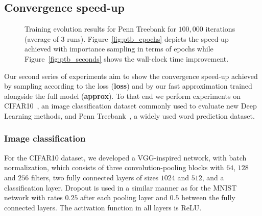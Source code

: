 \documentclass{article}
\begin{document}
\subsection{Convergence speed-up}

\begin{figure*}
    \caption{Training evolution results for Penn Treebank for $100,000$
    iterations (average of $3$ runs).  Figure~\ref{fig:ptb_epochs} depicts the
    speed-up achieved with importance sampling in terms of epochs while
    Figure~\ref{fig:ptb_seconds} shows the wall-clock time improvement.}
    \label{fig:ptb}
\end{figure*}

Our second series of experiments aim to show the convergence speed-up achieved
by sampling according to the loss (\textbf{loss}) and by our fast approximation
trained alongside the full model (\textbf{approx}). To that end we perform
experiments on CIFAR10~\cite{krizhevsky2009learning}, an image classification
dataset commonly used to evaluate new Deep Learning methods, and Penn
Treebank~\cite{marcus1993building}, a widely used word prediction dataset.

\subsubsection{Image classification}

For the CIFAR10 dataset, we developed a VGG-inspired network, with batch
normalization, which consists of three convolution-pooling blocks with $64$,
$128$ and $256$ filters, two fully connected layers of sizes $1024$ and $512$,
and a classification layer. Dropout is used in a similar manner as for the
MNIST network with rates $0.25$ after each pooling layer and $0.5$ between the
fully connected layers. The activation function in all layers is ReLU.
\end{document}
